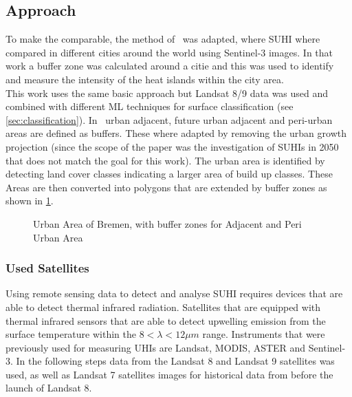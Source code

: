 \documentclass[12pt,a4paper, english]{article}
\begin{document}
    \subsection{Approach}
    To make the comparable, the method of~\cite{Sobrino2020} was adapted, where \gls{SUHI} where compared in different cities around the world using Sentinel-3 images.
    In that work a buffer zone was calculated around a citie and this was used to identify and measure the intensity of the heat islands within the city area.\\ 
    This work uses the same basic approach but Landsat 8/9 data was used and combined with different \gls{ML} techniques for surface classification (see \cref{sec:classification}). %
    In~\cite{Sobrino2020} urban adjacent, future urban adjacent and peri-urban areas are defined as buffers.
    These where adapted by removing the urban growth projection (since the scope of the paper was the investigation of \glspl{SUHI} in 2050 that does not match the goal for this work).
    The urban area is identified by detecting land cover classes indicating a larger area of build up classes. 
    These Areas are then converted into polygons that are extended by buffer zones as shown in \cref{fig:bufferedBremen}.
    \begin{figure}
      
      \caption{Urban Area of Bremen, with buffer zones for Adjacent and Peri Urban Area\label{fig:bufferedBremen}}
    \end{figure}
%    
    \subsubsection{Used Satellites}
    Using remote sensing data to detect and analyse \gls{SUHI} requires devices that are able to detect thermal infrared radiation. 
    Satellites that are equipped with thermal infrared sensors that are able to detect upwelling emission from the surface temperature within the $ 8 < \lambda < 12 \mu m $ range. 
    Instruments that were previously used for measuring \glspl{UHI} are Landsat, MODIS, ASTER and Sentinel-3. 
    In the following steps data from the Landsat 8 and Landsat 9 satellites was used, as well as Landsat 7 satellites images for historical data from before the launch of Landsat 8. 
\end{document}
